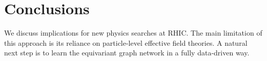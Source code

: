 \section{Conclusions}\label{sec:conclusions}

We discuss implications for new physics searches at RHIC. The main
limitation of this approach is its reliance on particle-level effective
field theories. A natural next step is to learn the equivariant graph
network in a fully data-driven way.

